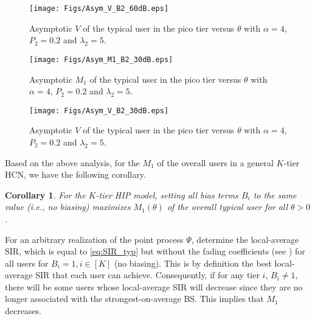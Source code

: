 \documentclass[12pt,draftclsnofoot,journal,onecolumn]{IEEEtran}
\newtheorem{corollary}{Corollary}
\newlength{\figwidth}
\begin{document}
\begin{figure} [!t]
	\begin{center}
		\texttt{[image: Figs/Asym\_V\_B2\_60dB.eps]}
		\caption{Asymptotic $V$ of the typical user in the pico tier versus $\theta$ with $\alpha=4$, $P_2=0.2$ and $\lambda_2=5$.}
		\label{fig:Asym_V2}
	\end{center}
\end{figure}

\begin{figure*}[!t]
	\begin{minipage}{0.45\linewidth}
		\centerline{\texttt{[image: Figs/Asym\_M1\_B2\_30dB.eps]}}
		\caption{Asymptotic $M_1$ of the typical user in the pico tier versus $\theta$ with $\alpha=4$, $P_2=0.2$ and $\lambda_2=5$.}
		\label{fig:Asym_M1_B2_30dB}
	\end{minipage}
	\hfill
	\begin{minipage}{0.45\linewidth}
		\centerline{\texttt{[image: Figs/Asym\_V\_B2\_30dB.eps]}}
		\caption{Asymptotic $V$ of the typical user in the pico tier versus $\theta$ with $\alpha=4$, $P_2=0.2$ and $\lambda_2=5$.}
		\label{fig:Asym_V_B2_30dB}
	\end{minipage}
\end{figure*}

Based on the above analysis, for the $M_1$ of the overall users in a general $K$-tier HCN, we have the following corollary.
\begin{corollary}
	For the $K$-tier HIP model, setting all bias terms $B_i$ to the same value (i.e., no biasing) maximizes $M_1(\theta)$ of the overall typical user for all $\theta>0$.
\end{corollary} 
\begin{IEEEproof}
	For an arbitrary realization of the point process $\Psi$, determine the local-average SIR, which is equal to \eqref{eq:SIR_typ} but without the fading coefficients (see \cite[Eqn. (11)]{George17}) for all users for $B_i=1, i\in[K]$ (no biasing). This is by definition the best local-average SIR that each user can achieve. Consequently, if for any tier $i$, $B_i\neq 1$, there will be some users whose local-average SIR will decrease since they are no longer associated with the strongest-on-average BS. This implies that $M_1$ decreases.
\end{IEEEproof}
\end{document}
